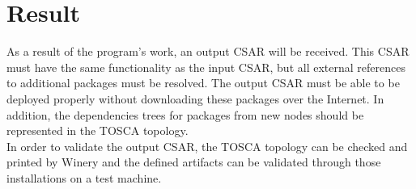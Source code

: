 \section*{Result}
As a result of the program's work, an output CSAR will be received. 
This CSAR must have the same functionality as the input CSAR, but all external references to additional packages must be resolved.
The output CSAR must be able to be deployed properly without downloading these packages over the Internet. 
In addition, the dependencies trees for packages from new nodes should be represented in the TOSCA topology.\\

In order to validate the output CSAR, the TOSCA topology can be checked and printed by Winery and the defined artifacts can be validated through those installations on a test machine. 